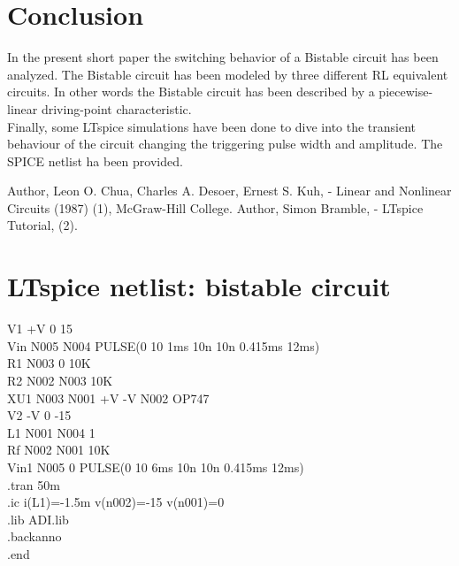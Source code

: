 \documentclass[letterpaper,11pt]{article}
\begin{document}
\section{Conclusion}
%
In the present short paper the switching behavior of a Bistable circuit has been analyzed. The Bistable circuit has been modeled by three different RL equivalent circuits. In other words the Bistable circuit has been described by a piecewise-linear driving-point characteristic.\\
Finally, some LTspice simulations have been done to dive into the transient behaviour of the circuit changing the triggering pulse width and amplitude. The SPICE netlist ha been provided.
%
\begin{thebibliography}{99}
Author, Leon O. Chua, Charles A. Desoer, Ernest S. Kuh, - Linear and Nonlinear Circuits (1987) (1), McGraw-Hill College.
Author, Simon Bramble, - LTspice Tutorial,  (2).
\end{thebibliography}

%
%
\clearpage
%
\appendix
%
\section{LTspice netlist: bistable circuit}
V1 +V 0 15\\
Vin N005 N004 PULSE(0 10 1ms 10n 10n 0.415ms 12ms)\\
R1 N003 0 10K\\
R2 N002 N003 10K\\
XU1 N003 N001 +V -V N002 OP747\\
V2 -V 0 -15\\
L1 N001 N004 1\\
Rf N002 N001 10K\\
Vin1 N005 0 PULSE(0 10 6ms 10n 10n 0.415ms 12ms)\\
.tran 50m\\
.ic i(L1)=-1.5m v(n002)=-15 v(n001)=0\\
.lib ADI.lib\\
.backanno\\
.end\\
\end{document}

